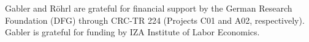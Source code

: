 Gabler and Röhrl are grateful for financial support by the German Research Foundation (DFG) through CRC-TR 224 (Projects C01 and A02, respectively). Gabler is grateful for funding by IZA Institute of Labor Economics.
